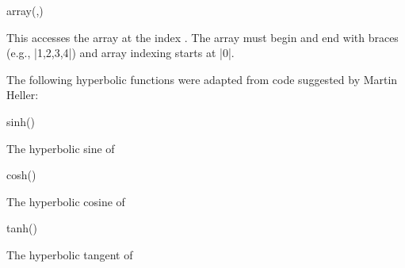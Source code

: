 \begin{math-function}{array(,)}
\mathcommand

	This accesses the array  at the index . The
	array must begin and end with braces (e.g., |{1,2,3,4}|) and
	array indexing starts at |0|.
	
\begin{codeexample}[]
 \pgfmathresult
\end{codeexample}

\end{math-function}


The following hyperbolic functions were adapted from code
suggested by Martin Heller:

\begin{math-function}{sinh()}
\mathcommand

	The hyperbolic sine of %
	
\begin{codeexample}[]
 \pgfmathresult
\end{codeexample}

\end{math-function}

\begin{math-function}{cosh()}
\mathcommand

	The hyperbolic cosine of %
	
\begin{codeexample}[]
 \pgfmathresult
\end{codeexample}

\end{math-function}

\begin{math-function}{tanh()}
\mathcommand

	The hyperbolic tangent of %
	
\begin{codeexample}[]
 \pgfmathresult
\end{codeexample}

\end{math-function}


